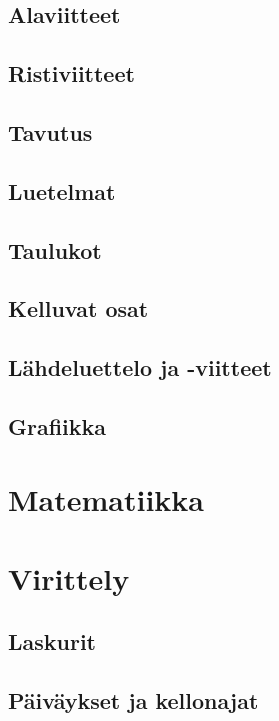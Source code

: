 \documentclass[a4paper,10pt,notitlepage,oneside]{book}
\begin{document}
\section{Alaviitteet}
\section{Ristiviitteet}
\section{Tavutus}
\section{Luetelmat}
\section{Taulukot}
\section{Kelluvat osat}
\section{Lähdeluettelo ja -viitteet}
\section{Grafiikka}

\chapter{Matematiikka}

\chapter{Virittely}
\section{Laskurit}
\section{Päiväykset ja kellonajat}
\end{document}
